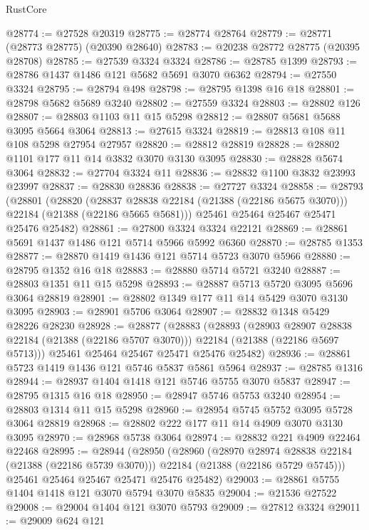 \begin{lexlean}{RustCore}
\begin{coremodule}
@28774 := @27528 @20319
@28775 := @28774 @28764
@28779 := @28771 (@28773 @28775) (@20390 @28640)
@28783 := @20238 @28772 @28775 (@20395 @28708)
@28785 := @27539 @3324 @3324
@28786 := @28785 @1399
@28793 := @28786 @1437 @1486 @121 @5682 @5691 @3070 @6362
@28794 := @27550 @3324
@28795 := @28794 @498
@28798 := @28795 @1398 @16 @18
@28801 := @28798 @5682 @5689 @3240
@28802 := @27559 @3324
@28803 := @28802 @126
@28807 := @28803 @1103 @11 @15 @5298
@28812 := @28807 @5681 @5688 @3095 @5664 @3064
@28813 := @27615 @3324
@28819 := @28813 @108 @11 @108 @5298 @27954 @27957
@28820 := @28812 @28819
@28828 := @28802 @1101 @177 @11 @14 @3832 @3070 @3130 @3095
@28830 := @28828 @5674 @3064
@28832 := @27704 @3324 @11
@28836 := @28832 @1100 @3832 @23993 @23997
@28837 := @28830 @28836
@28838 := @27727 @3324
@28858 := @28793
    (@28801
      (@28820
        (@28837 @28838 @22184 (@21388 (@22186 @5675 @3070)))
        @22184
        (@21388 (@22186 @5665 @5681)))
      @25461
      @25464
      @25467
      @25471
      @25476
      @25482)
@28861 := @27800 @3324 @3324 @22121
@28869 := @28861 @5691 @1437 @1486 @121 @5714 @5966 @5992 @6360
@28870 := @28785 @1353
@28877 := @28870 @1419 @1436 @121 @5714 @5723 @3070 @5966
@28880 := @28795 @1352 @16 @18
@28883 := @28880 @5714 @5721 @3240
@28887 := @28803 @1351 @11 @15 @5298
@28893 := @28887 @5713 @5720 @3095 @5696 @3064 @28819
@28901 := @28802 @1349 @177 @11 @14 @5429 @3070 @3130 @3095
@28903 := @28901 @5706 @3064
@28907 := @28832 @1348 @5429 @28226 @28230
@28928 := @28877
    (@28883
      (@28893
        (@28903 @28907 @28838 @22184 (@21388 (@22186 @5707 @3070)))
        @22184
        (@21388 (@22186 @5697 @5713)))
      @25461
      @25464
      @25467
      @25471
      @25476
      @25482)
@28936 := @28861 @5723 @1419 @1436 @121 @5746 @5837 @5861 @5964
@28937 := @28785 @1316
@28944 := @28937 @1404 @1418 @121 @5746 @5755 @3070 @5837
@28947 := @28795 @1315 @16 @18
@28950 := @28947 @5746 @5753 @3240
@28954 := @28803 @1314 @11 @15 @5298
@28960 := @28954 @5745 @5752 @3095 @5728 @3064 @28819
@28968 := @28802 @222 @177 @11 @14 @4909 @3070 @3130 @3095
@28970 := @28968 @5738 @3064
@28974 := @28832 @221 @4909 @22464 @22468
@28995 := @28944
    (@28950
      (@28960
        (@28970 @28974 @28838 @22184 (@21388 (@22186 @5739 @3070)))
        @22184
        (@21388 (@22186 @5729 @5745)))
      @25461
      @25464
      @25467
      @25471
      @25476
      @25482)
@29003 := @28861 @5755 @1404 @1418 @121 @3070 @5794 @3070 @5835
@29004 := @21536 @27522
@29008 := @29004 @1404 @121 @3070 @5793
@29009 := @27812 @3324
@29011 := @29009 @624 @121

\end{coremodule}
\end{lexlean}
